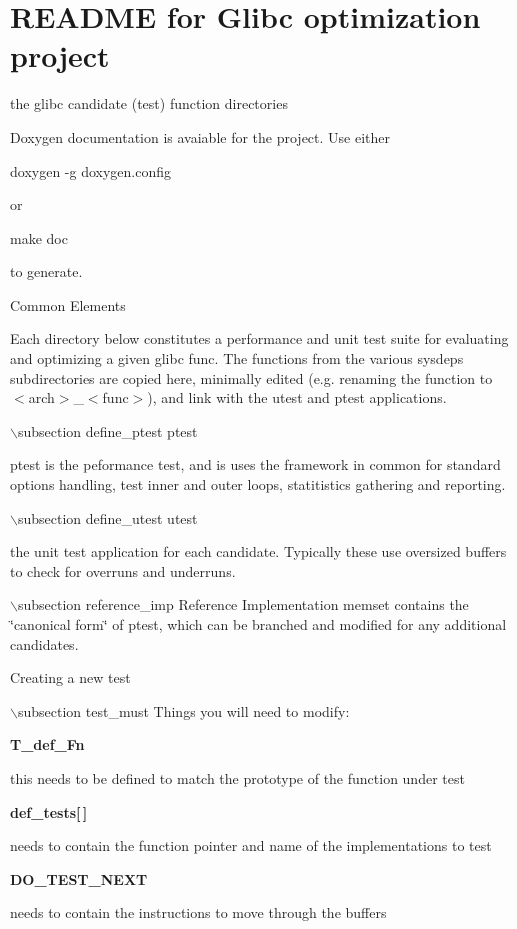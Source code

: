 \section{README for Glibc optimization project}
\label{group__project__readme}
the glibc candidate (test) function directories

Doxygen documentation is avaiable for the project. Use either

doxygen -g doxygen.config

or

make doc

to generate.

Common Elements

Each directory below constitutes a performance and unit test suite for evaluating and optimizing a given glibc func. The functions from the various sysdeps subdirectories are copied here, minimally edited (e.g. renaming the function to $<$arch$>$\_\-$<$func$>$), and link with the utest and ptest applications.

$\backslash$subsection define\_\-ptest ptest

ptest is the peformance test, and is uses the framework in common for standard options handling, test inner and outer loops, statitistics gathering and reporting.

$\backslash$subsection define\_\-utest utest

the unit test application for each candidate. Typically these use oversized buffers to check for overruns and underruns.

$\backslash$subsection reference\_\-imp Reference Implementation memset contains the \char`\"{}canonical form\char`\"{} of ptest, which can be branched and modified for any additional candidates.

Creating a new test

$\backslash$subsection test\_\-must Things you will need to modify:

{\bf {\bf T\_\-def\_\-Fn}}

this needs to be defined to match the prototype of the function under test

{\bf {\bf def\_\-tests}[$\,$]}

needs to contain the function pointer and name of the implementations to test

{\bf DO\_\-TEST\_\-NEXT}

needs to contain the instructions to move through the buffers

